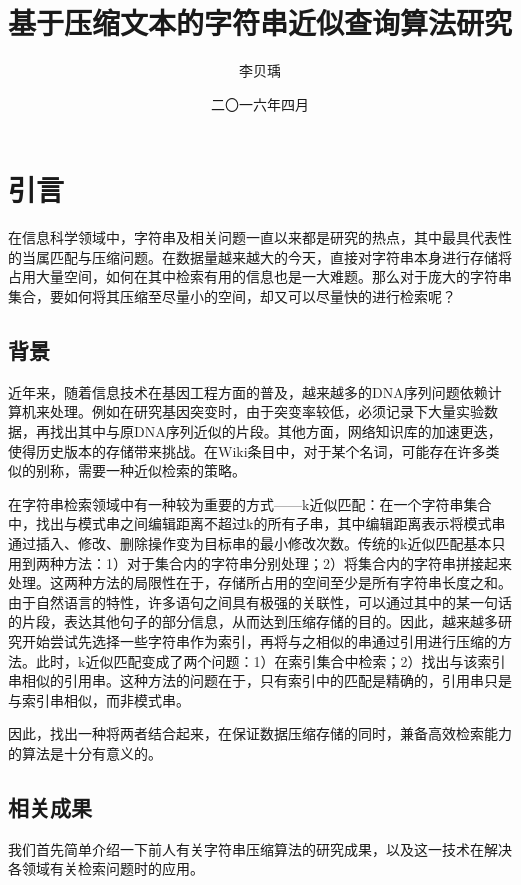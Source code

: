 ﻿\documentclass{sysuthesis}
\title{基于压缩文本的字符串近似查询算法研究}
\author{李贝瑀}
\date{二〇一六年四月}
\begin{document}
\frontmatter

\cleardoublepage
\tableofcontents

\mainmatter



\chapter{引言}
在信息科学领域中，字符串及相关问题一直以来都是研究的热点，其中最具代表性的当属匹配\cite{knuth1977fast}与压缩\cite{ziv1977universal}问题。在数据量越来越大的今天，直接对字符串本身进行存储将占用大量空间，如何在其中检索有用的信息也是一大难题。那么对于庞大的字符串集合，要如何将其压缩至尽量小的空间，却又可以尽量快的进行检索呢？



\section{背景}
近年来，随着信息技术在基因工程方面的普及，越来越多的DNA序列问题依赖计算机来处理。例如在研究基因突变时，由于突变率较低，必须记录下大量实验数据，再找出其中与原DNA序列近似的片段。其他方面，网络知识库的加速更迭，使得历史版本的存储带来挑战。在Wiki条目中，对于某个名词，可能存在许多类似的别称，需要一种近似检索的策略。\par
在字符串检索领域中有一种较为重要的方式——k近似匹配：在一个字符串集合中，找出与模式串之间编辑距离不超过k的所有子串，其中编辑距离表示将模式串通过插入、修改、删除操作变为目标串的最小修改次数。传统的k近似匹配基本只用到两种方法：1）对于集合内的字符串分别处理；2）将集合内的字符串拼接起来处理。这两种方法的局限性在于，存储所占用的空间至少是所有字符串长度之和。由于自然语言的特性，许多语句之间具有极强的关联性，可以通过其中的某一句话的片段，表达其他句子的部分信息，从而达到压缩存储的目的。因此，越来越多研究开始尝试先选择一些字符串作为索引，再将与之相似的串通过引用进行压缩的方法。此时，k近似匹配变成了两个问题：1）在索引集合中检索；2）找出与该索引串相似的引用串。这种方法的问题在于，只有索引中的匹配是精确的，引用串只是与索引串相似，而非模式串。\par
因此，找出一种将两者结合起来，在保证数据压缩存储的同时，兼备高效检索能力的算法是十分有意义的。



\section{相关成果}
我们首先简单介绍一下前人有关字符串压缩算法的研究成果，以及这一技术在解决各领域有关检索问题时的应用。
\end{document}
